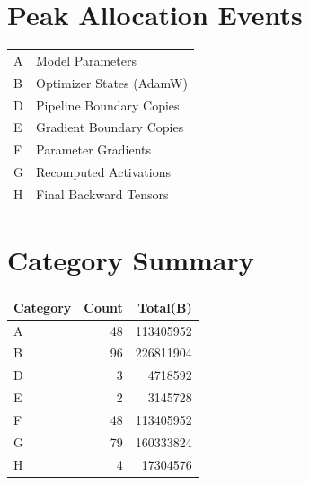 \documentclass{article}
\begin{document}
\section*{Peak Allocation Events}
\small
\begin{tabular}{ll}
A & Model Parameters \\
B & Optimizer States (AdamW) \\
D & Pipeline Boundary Copies \\
E & Gradient Boundary Copies \\
F & Parameter Gradients \\
G & Recomputed Activations \\
H & Final Backward Tensors \\
\end{tabular}
\vspace{0.5em}
\section*{Category Summary}
\begin{tabular}{l r r}
Category & Count & Total(B) \\
\hline
A & 48 & 113405952 \\
B & 96 & 226811904 \\
D & 3 & 4718592 \\
E & 2 & 3145728 \\
F & 48 & 113405952 \\
G & 79 & 160333824 \\
H & 4 & 17304576 \\
\end{tabular}
\vspace{0.5em}
\end{document}

